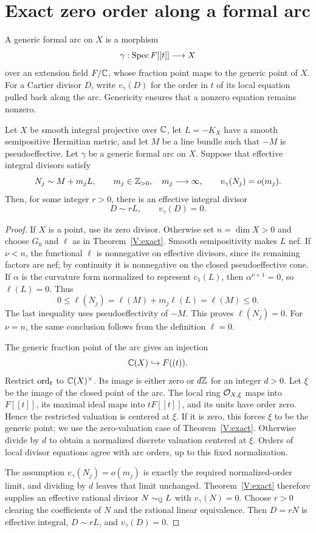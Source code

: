 \section{Exact zero order along a formal arc}
\label{sec:arc}

A generic formal arc on \(X\) is a morphism
\[
\gamma:\operatorname{Spec} F[[t]]\longrightarrow X
\]
over an extension field \(F/\mathbb C\), whose fraction point maps to the
generic point of \(X\). For a Cartier divisor \(D\), write
\(v_\gamma(D)\) for the order in \(t\) of its local equation pulled
back along the arc. Genericity ensures that a nonzero equation remains
nonzero.

\begin{corollary}
\label{cor:arc}
Let \(X\) be smooth
integral projective over \(\mathbb C\), let \(L=-K_X\) have a smooth
semipositive Hermitian metric, and let \(M\) be a line bundle such that
\(-M\) is pseudoeffective. Let \(\gamma\) be a generic formal arc on
\(X\). Suppose that effective integral divisors satisfy
\[
N_j\sim M+m_jL,\qquad
m_j\in\mathbb Z_{>0},\quad m_j\longrightarrow\infty,\qquad
v_\gamma(N_j)=o(m_j).
\]
Then, for some integer \(r>0\), there is an effective integral divisor
\[
D\sim rL,\qquad v_\gamma(D)=0.
\]
\end{corollary}

\begin{proof}
If \(X\) is a point, use its zero divisor. Otherwise set \(n=\dim X>0\)
and choose \(G_0\) and \(\ell\) as in
Theorem~\ref{V:exact}. Smooth semipositivity makes \(L\)
nef. If \(\nu<n\), the functional \(\ell\) is nonnegative on effective
divisors, since its remaining factors are nef; by continuity it is
nonnegative on the closed pseudoeffective cone. If \(\alpha\) is the
curvature form normalized to represent \(c_1(L)\), then
\(\alpha^{\nu+1}=0\), so \(\ell(L)=0\). Thus
\[
0\leq\ell(N_j)
=\ell(M)+m_j\ell(L)
=\ell(M)\leq0.
\]
The last inequality uses pseudoeffectivity of \(-M\). This proves
\(\ell(N_j)=0\). For \(\nu=n\), the same conclusion follows from
the definition \(\ell=0\).

The generic fraction point of the arc gives an injection
\[
\mathbb C(X)\hookrightarrow F((t)).
\]
Restrict \(\operatorname{ord}_t\) to \(\mathbb C(X)^\times\). Its image is either zero
or \(d\mathbb Z\) for an integer \(d>0\). Let \(\xi\) be the image of the
closed point of the arc. The local ring \(\mathcal O_{X,\xi}\) maps into
\(F[[t]]\), its maximal ideal maps into \(tF[[t]]\), and its units
have order zero. Hence the restricted valuation is centered at \(\xi\).
If it is zero, this forces \(\xi\) to be the generic point; we use
the zero-valuation case of Theorem~\ref{V:exact}. Otherwise divide by
\(d\) to obtain a normalized discrete valuation centered at \(\xi\).
Orders of local divisor equations agree with arc orders, up to this
fixed normalization.

The assumption \(v_\gamma(N_j)=o(m_j)\) is exactly the required
normalized-order limit, and dividing by \(d\) leaves that limit unchanged.
Theorem~\ref{V:exact} therefore supplies an effective
rational divisor \(N\sim_{\mathbb Q}L\) with \(v_\gamma(N)=0\). Choose \(r>0\)
clearing the coefficients of \(N\) and the rational linear equivalence.
Then \(D=rN\) is effective integral, \(D\sim rL\), and
\(v_\gamma(D)=0\).
\end{proof}

